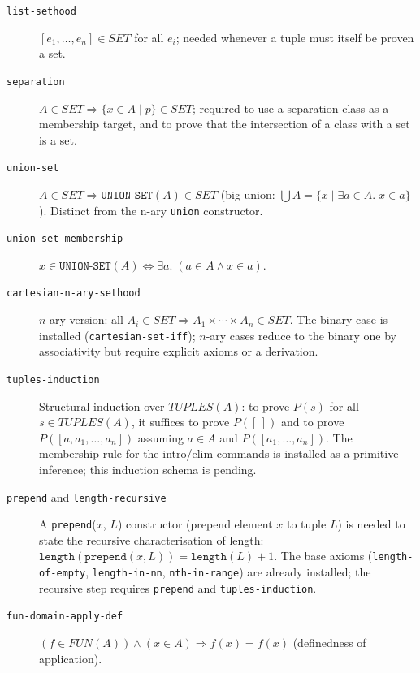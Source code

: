 \documentclass{amsbook}[openany]
\theoremstyle{definition}
\theoremstyle{remark}
\theoremstyle{remark}
\begin{document}
\begin{description}

\item[\texttt{list-sethood}]
  $[e_1,\ldots,e_n] \in \mathit{SET}$ for all $e_i$;
  needed whenever a tuple must itself be proven a set.

\item[\texttt{separation}]
  $A \in \mathit{SET} \Rightarrow \{x \in A \mid p\} \in \mathit{SET}$;
  required to use a separation class as a membership target, and to prove
  that the intersection of a class with a set is a set.

\item[\texttt{union-set}]
  $A \in \mathit{SET} \Rightarrow \texttt{UNION-SET}(A) \in \mathit{SET}$
  (big union: $\bigcup A = \{x \mid \exists a \in A.\; x \in a\}$).
  Distinct from the n-ary \texttt{union} constructor.

\item[\texttt{union-set-membership}]
  $x \in \texttt{UNION-SET}(A) \Leftrightarrow \exists a.\;(a \in A \land x \in a)$.

\item[\texttt{cartesian-n-ary-sethood}]
  $n$-ary version: all $A_i \in \mathit{SET} \Rightarrow
  A_1 \times \cdots \times A_n \in \mathit{SET}$.  The binary case is
  installed (\texttt{cartesian-set-iff}); $n$-ary cases reduce to the
  binary one by associativity but require explicit axioms or a derivation.

\item[\texttt{tuples-induction}]
  Structural induction over $\mathit{TUPLES}(A)$: to prove $P(s)$ for all
  $s \in \mathit{TUPLES}(A)$, it suffices to prove $P([\,])$ and to prove
  $P([a, a_1, \ldots, a_n])$ assuming $a \in A$ and $P([a_1,\ldots,a_n])$.
  The membership rule for the intro/elim commands is installed as a
  primitive inference; this induction schema is pending.

\item[\texttt{prepend} and \texttt{length-recursive}]
  A \texttt{prepend}($x$, $L$) constructor (prepend element $x$ to tuple
  $L$) is needed to state the recursive characterisation of length:
  $\texttt{length}(\texttt{prepend}(x, L)) = \texttt{length}(L) + 1$.
  The base axioms (\texttt{length-of-empty}, \texttt{length-in-nn},
  \texttt{nth-in-range}) are already installed; the recursive step requires
  \texttt{prepend} and \texttt{tuples-induction}.

\item[\texttt{fun-domain-apply-def}]
  $(f \in \mathit{FUN}(A)) \land (x \in A) \Rightarrow f(x) = f(x)$
  (definedness of application).


\end{description}
\end{document}
